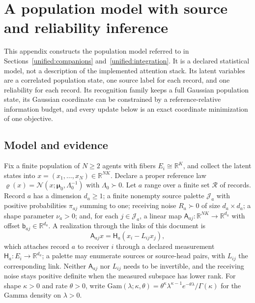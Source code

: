 \documentclass[11pt]{article}
\theoremstyle{definition}
\theoremstyle{remark}
\providecommand{\N}{\mathcal{N}}
\providecommand{\R}{\mathbb{R}}
\begin{document}
\section{A population model with source and reliability inference}
\label{unified:population}

This appendix constructs the population model referred to in Sections~\ref{unified:companions} and~\ref{unified:integration}. It is a declared statistical model, not a description of the implemented attention stack. Its latent variables are a correlated population state, one source label for each record, and one reliability for each record. Its recognition family keeps a full Gaussian population state, its Gaussian coordinate can be constrained by a reference-relative information budget, and every update below is an exact coordinate minimization of one objective.

\subsection{Model and evidence}

Fix a finite population of $N\ge2$ agents with fibers $E_i\cong\R^K$, and collect the latent states into $x=(x_1,\ldots,x_N)\in\R^{NK}$. Declare a proper reference law $\varrho(x)=\N(x;\boldsymbol\mu_0,\Lambda_0^{-1})$ with $\Lambda_0\succ0$. Let $a$ range over a finite set $\mathcal R$ of records. Record $a$ has a dimension $d_a\ge1$; a finite nonempty source palette $\mathcal J_a$ with positive probabilities $\pi_{aj}$ summing to one; receiving noise $R_a\succ0$ of size $d_a\times d_a$; a shape parameter $\nu_a>0$; and, for each $j\in\mathcal J_a$, a linear map $\mathsf A_{aj}:\R^{NK}\to\R^{d_a}$ with offset $\mathsf b_{aj}\in\R^{d_a}$. A realization through the links of this document is
\begin{equation}
\mathsf A_{aj}x=\mathsf H_a(x_i-L_{ij}x_j),
\label{unified:pop:eq:link_record}
\end{equation}
which attaches record $a$ to receiver $i$ through a declared measurement $\mathsf H_a:E_i\to\R^{d_a}$; a palette may enumerate sources or source-head pairs, with $L_{ij}$ the corresponding link. Neither $\mathsf A_{aj}$ nor $L_{ij}$ needs to be invertible, and the receiving noise stays positive definite when the measured subspace has lower rank. For shape $\kappa>0$ and rate $\theta>0$, write $\mathrm{Gam}(\lambda;\kappa,\theta)=\theta^\kappa\lambda^{\kappa-1}e^{-\theta\lambda}/\Gamma(\kappa)$ for the Gamma density on $\lambda>0$.
\end{document}
